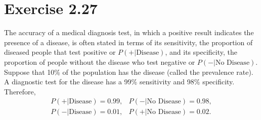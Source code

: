 \documentclass{article}
\begin{document}
			\section*{Exercise 2.27}
			
				The accuracy of a medical diagnosis test, in which a positive result indicates the presence of a disease, is often stated in terms of its sensitivity, the proportion of diseased people that test positive or $P(+|\text{Disease})$, and its specificity, the proportion of people without the disease who test negative or $P(-|\text{No Disease})$. Suppose that 10\% of the population has the disease (called the prevalence rate). A diagnostic test for the disease has a 99\% sensitivity and 98\% specificity. Therefore,
				\begin{align*}
					P(+|\text{Disease}) = 0.99,& P(-|\text{No Disease}) = 0.98,\\
					P(-|\text{Disease}) = 0.01,& P(+|\text{No Disease}) = 0.02.\\
				\end{align*}
				
\end{document}
